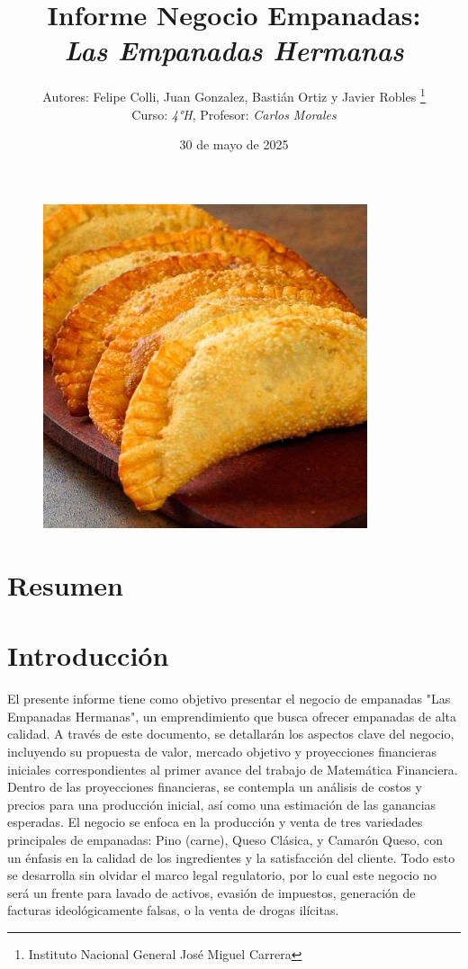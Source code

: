\documentclass[12pt]{article}
\title{Informe Negocio Empanadas: \\
\textit{Las Empanadas Hermanas}} %
\author{Autores: Felipe Colli, Juan Gonzalez, Bastián Ortiz y Javier Robles \thanks{Instituto Nacional General José Miguel Carrera} \\
  Curso: \textit{4°H}, Profesor: \textit{Carlos Morales}} %
\date{30 de mayo de 2025} %
\begin{document}
\maketitle
\begin{figure}[h]
    \centering
    \includegraphics[width=0.85\textwidth]{empanadas} %
\end{figure}
\newpage

\tableofcontents
\newpage

\section{Resumen} %
\newpage



\section{Introducción} %
El presente informe tiene como objetivo presentar el negocio de empanadas "Las Empanadas Hermanas", un emprendimiento que busca ofrecer empanadas de alta calidad. A través de este documento, se detallarán los aspectos clave del negocio, incluyendo su propuesta de valor, mercado objetivo y proyecciones financieras iniciales correspondientes al primer avance del trabajo de Matemática Financiera. \\

Dentro de las proyecciones financieras, se contempla un análisis de costos y precios para una producción inicial, así como una estimación de las ganancias esperadas. El negocio se enfoca en la producción y venta de tres variedades principales de empanadas: Pino (carne), Queso Clásica, y Camarón Queso, con un énfasis en la calidad de los ingredientes y la satisfacción del cliente. Todo esto se desarrolla sin olvidar el marco legal regulatorio, por lo cual este negocio no será un frente para lavado de activos, evasión de impuestos, generación de facturas ideológicamente falsas, o la venta de drogas ilícitas. \\ %
\end{document}
